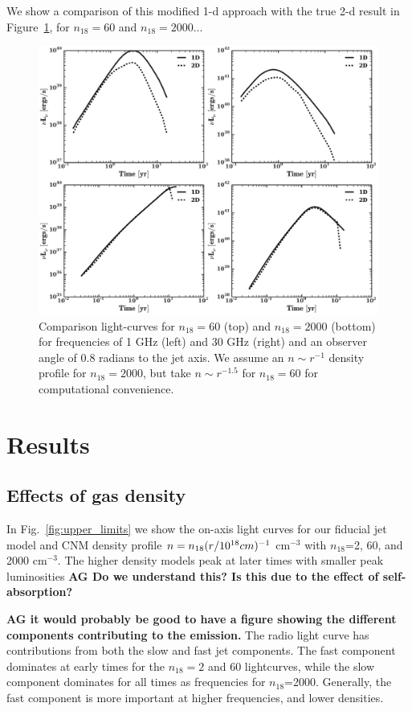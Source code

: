 \documentclass[usenatbib,fleqn]{mnras}
\begin{document}
We show a comparison of this modified 1-d approach with the true
2-d result in Figure~\ref{fig:1d2dB}, for $n_{18}=60$ and
$n_{18}=2000$...

\begin{figure}
\includegraphics[width=16cm]{1d_2d.pdf}
\caption{\label{fig:1d2dB} Comparison light-curves for $n_{18}=60$
  (top) and $n_{18}=2000$ (bottom) for frequencies of 1 GHz (left) and
  30 GHz (right) and an observer angle of 0.8 radians to the jet
  axis. We assume an $n\sim r^{-1}$ density profile for $n_{18}=2000$,
  but take $n\sim r^{-1.5}$ for $n_{18}=60$ for computational
  convenience.}
\end{figure}


\section{Results}
\label{sec:results}

\subsection{Effects of gas density}

In Fig.~\ref{fig:upper_limits} we show the on-axis light curves for
our fiducial jet model and CNM density profile $n=n_{18} (r/10^{18}
{\rm} cm)^{-1}$ cm$^{-3}$ with $n_{18}$=2, 60, and 2000 cm$^{-3}$. The
higher density models peak at later times with smaller peak
luminosities {\bf AG Do we understand this? Is this due to the effect
  of self-absorption?}

{\bf AG it would probably be good to have a figure showing the
  different components contributing to the emission.} The radio light
curve has contributions from both the slow and fast jet
components. The fast component dominates at
early times for the $n_{18}=2$ and 60 lightcurves, while the slow
component dominates for all times as frequencies for
$n_{18}$=2000. Generally, the fast component is more important at
higher frequencies, and lower densities.
\end{document}

